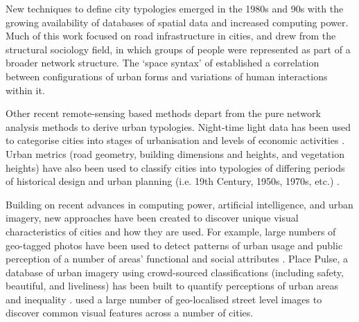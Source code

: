 \documentclass[Crown,sageh,times]{sagej}
\begin{document}
New techniques to define city typologies emerged in the 1980s and 90s with the growing availability of databases of spatial data and increased computing power. Much of this work focused on road infrastructure in cities, and drew from the structural sociology field, in which groups of people were represented as part of a broader network structure. The `space syntax' of \citet{Hillier1996} established a correlation between configurations of urban forms and variations of human interactions within it. 

Other recent remote-sensing based methods depart from the pure network analysis methods to derive urban typologies. Night-time light data has been used to categorise cities into stages of urbanisation and levels of economic activities \citep{Zhang2013}. Urban metrics (road geometry, building dimensions and heights, and vegetation heights) have also been used to classify cities into typologies of differing periods of historical design and urban planning (i.e. 19th Century, 1950s, 1970s, etc.) \citep{Hermosilla2014}.

Building on recent advances in computing power, artificial intelligence, and urban imagery, new approaches have been created to discover unique visual characteristics of cities and how they are used. For example, large numbers of geo-tagged photos have been used to detect patterns of urban usage and public perception of a number of areas' functional and social attributes \citep{Liu2016,Zhou2014a}. Place Pulse, a database of urban imagery using crowd-sourced classifications (including safety, beautiful, and liveliness) has been built to quantify perceptions of urban areas \citep{Dubey2016,Naik2014} and inequality \citep{Salesses2013}. 
\citet{Doersch2012} used a large number of geo-localised street level images to discover common visual features across a number of cities.

\end{document}
